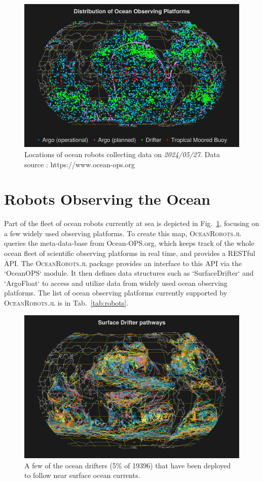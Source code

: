 \documentclass{juliacon}[12pt]
\newcommand{\pkg}[1]{{\small \textsc{#1}}}
\begin{document}
\begin{figure}[t]
\centerline{\includegraphics[width=\columnwidth]{figs/20240528_OceanOPS.png}}
\caption{Locations of ocean robots collecting data on {\it 2024/05/27}. Data source : https://www.ocean-ops.org}
\label{fig:ocean-ops}
\end{figure}

\section{Robots Observing the Ocean}

Part of the fleet of ocean robots currently at sea is depicted in Fig.~\ref{fig:ocean-ops}, focusing on a few widely used observing platforms. To create this map, \pkg{OceanRobots.jl} queries the meta-data-base from Ocean-OPS.org, which keeps track of the whole ocean fleet of scientific observing platforms in real time, and provides a RESTful API. The \pkg{OceanRobots.jl} package provides an interface to this API via the `OceanOPS` module. It then defines data structures such as  `SurfaceDrifter` and `ArgoFloat` to access and utilize data from widely used ocean observing platforms. The list of ocean observing platforms currently supported by \pkg{OceanRobots.jl} is in Tab.~\ref{tab:robots}.

\begin{figure}[t]
\centerline{\includegraphics[width=\columnwidth]{figs/20240528_drifters_5percent.png}}
\caption{A few of the ocean drifters (5\% of 19396) that have been deployed to follow near surface ocean currents.}
\label{fig:drifters}
\end{figure}
\end{document}
